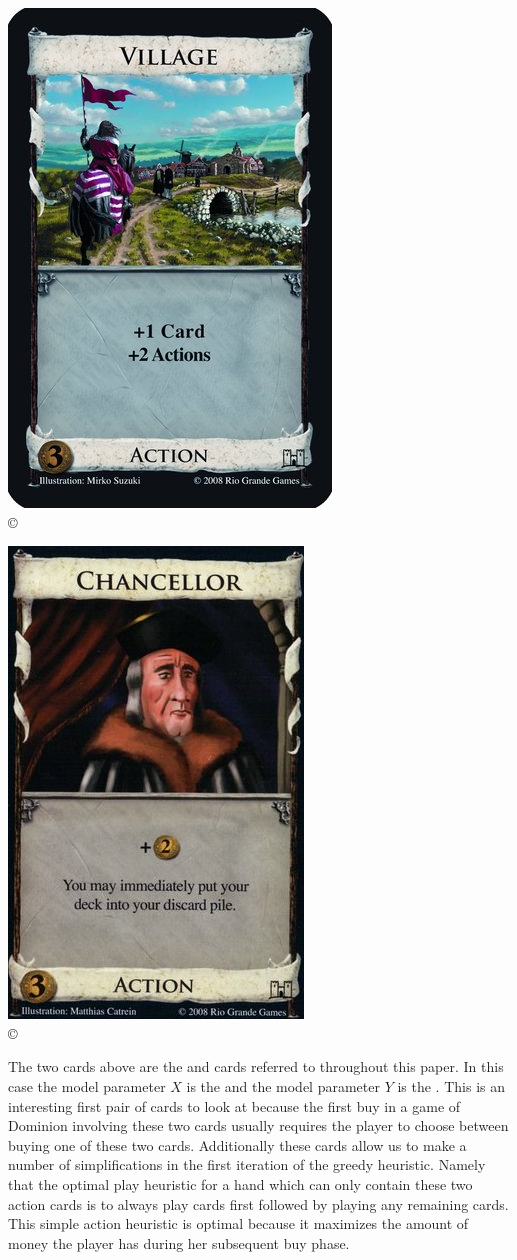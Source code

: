 \begin{multicols}{2}
  \begin{flushright}
    \includegraphics[width=.45\columnwidth]{../pres/village.jpg} \\
    \copyright \cite{dominion}
    \end{flushright}
  \columnbreak
  \begin{flushleft}
    \includegraphics[width=.45\columnwidth]{../pres/chancellor.jpg} \\
    \copyright \cite{dominion}
    \end{flushleft}
\end{multicols}

The two cards above are the  and  cards referred to
throughout this paper. In this case the model parameter $X$ is the  and
the model parameter $Y$ is the . This is an interesting first pair
of cards to look at because the first buy in a game of Dominion involving these two
cards usually requires the player to choose between buying one of these two cards.
Additionally these cards allow us to make a number of simplifications in the first
iteration of the greedy heuristic. Namely that the optimal play heuristic for a hand
which can only contain these two action cards is to always play  cards
first followed by playing any remaining  cards. This simple action
heuristic is optimal because it maximizes the amount of money the player has during
her subsequent buy phase.

